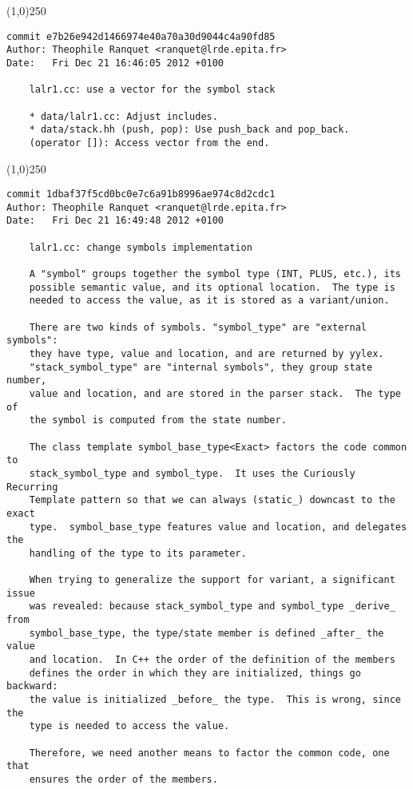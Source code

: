 \line(1,0){250}
\begin{verbatim}
commit e7b26e942d1466974e40a70a30d9044c4a90fd85
Author: Theophile Ranquet <ranquet@lrde.epita.fr>
Date:   Fri Dec 21 16:46:05 2012 +0100

    lalr1.cc: use a vector for the symbol stack
    
    * data/lalr1.cc: Adjust includes.
    * data/stack.hh (push, pop): Use push_back and pop_back.
    (operator []): Access vector from the end.

\end{verbatim}
\line(1,0){250}
\begin{verbatim}
commit 1dbaf37f5cd0bc0e7c6a91b8996ae974c8d2cdc1
Author: Theophile Ranquet <ranquet@lrde.epita.fr>
Date:   Fri Dec 21 16:49:48 2012 +0100

    lalr1.cc: change symbols implementation
    
    A "symbol" groups together the symbol type (INT, PLUS, etc.), its
    possible semantic value, and its optional location.  The type is
    needed to access the value, as it is stored as a variant/union.
    
    There are two kinds of symbols. "symbol_type" are "external symbols":
    they have type, value and location, and are returned by yylex.
    "stack_symbol_type" are "internal symbols", they group state number,
    value and location, and are stored in the parser stack.  The type of
    the symbol is computed from the state number.
    
    The class template symbol_base_type<Exact> factors the code common to
    stack_symbol_type and symbol_type.  It uses the Curiously Recurring
    Template pattern so that we can always (static_) downcast to the exact
    type.  symbol_base_type features value and location, and delegates the
    handling of the type to its parameter.
    
    When trying to generalize the support for variant, a significant issue
    was revealed: because stack_symbol_type and symbol_type _derive_ from
    symbol_base_type, the type/state member is defined _after_ the value
    and location.  In C++ the order of the definition of the members
    defines the order in which they are initialized, things go backward:
    the value is initialized _before_ the type.  This is wrong, since the
    type is needed to access the value.
    
    Therefore, we need another means to factor the common code, one that
    ensures the order of the members.
    

\end{verbatim}
